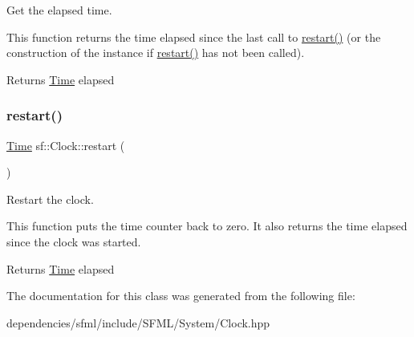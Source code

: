 Get the elapsed time. 

This function returns the time elapsed since the last call to \hyperlink{classsf_1_1_clock_a123e2627f2943e5ecaa1db0c7df3231b}{restart()} (or the construction of the instance if \hyperlink{classsf_1_1_clock_a123e2627f2943e5ecaa1db0c7df3231b}{restart()} has not been called).

\begin{DoxyReturn}{Returns}
\hyperlink{classsf_1_1_time}{Time} elapsed 
\end{DoxyReturn}
\mbox{\label{classsf_1_1_clock_a123e2627f2943e5ecaa1db0c7df3231b}} 
\subsubsection{\texorpdfstring{restart()}{restart()}}
{\footnotesize\ttfamily \hyperlink{classsf_1_1_time}{Time} sf\+::\+Clock\+::restart (\begin{DoxyParamCaption}{ }\end{DoxyParamCaption})}



Restart the clock. 

This function puts the time counter back to zero. It also returns the time elapsed since the clock was started.

\begin{DoxyReturn}{Returns}
\hyperlink{classsf_1_1_time}{Time} elapsed 
\end{DoxyReturn}


The documentation for this class was generated from the following file\+:\begin{DoxyCompactItemize}
\item 
dependencies/sfml/include/\+S\+F\+M\+L/\+System/Clock.\+hpp\end{DoxyCompactItemize}
